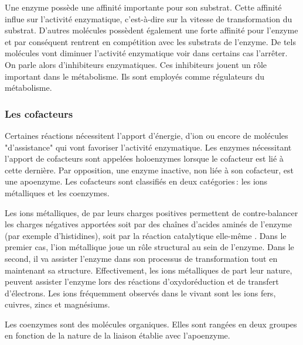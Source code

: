 \begin{refsegment}
    Une enzyme possède une affinité importante pour son substrat. Cette affinité influe sur l’activité enzymatique, c’est-à-dire sur la vitesse de transformation du substrat. D'autres molécules possèdent également une forte affinité pour l’enzyme et par conséquent rentrent en compétition avec les substrats de l'enzyme. De tels molécules vont diminuer l’activité enzymatique voir dans certains cas l'arrêter. On parle alors d'inhibiteurs enzymatiques. Ces inhibiteurs jouent un rôle important dans le métabolisme. Ils sont employés comme régulateurs du métabolisme. 
    

    \subsubsection{Les cofacteurs}
    Certaines réactions nécessitent l’apport d'énergie, d’ion ou encore de molécules "d'assistance" qui vont favoriser l’activité enzymatique. Les enzymes nécessitant l'apport de cofacteurs sont appelées holoenzymes lorsque le cofacteur est lié à cette dernière. Par opposition, une enzyme inactive, non liée à son cofacteur, est une apoenzyme. Les cofacteurs sont classifiés en deux catégories : les ions métalliques et les coenzymes.
    
    Les ions métalliques, de par leurs charges positives permettent de contre-balancer les charges négatives apportées soit par des chaînes d'acides aminés de l'enzyme (par exemple d'histidines), soit par la réaction catalytique elle-même \cite{christianson1991structural}. Dans le premier cas, l'ion métallique joue un rôle structural au sein de l'enzyme. Dans le second, il va assister l'enzyme dans son processus de transformation tout en maintenant sa structure. Effectivement, les ions métalliques de part leur nature, peuvent assister l'enzyme lors des réactions d'oxydoréduction et de transfert d'électrons. Les ions fréquemment observés dans le vivant sont les ions fers, cuivres, zincs et magnésiums.
    
    Les coenzymes sont des molécules organiques. Elles sont rangées en deux groupes en fonction de la nature de la liaison établie avec l'apoenzyme.
    

\end{refsegment}
